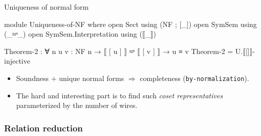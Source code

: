 \documentclass[aspectratio=169]{beamer}
\begin{document}
\begin{frame}{Uniqueness of normal form}
\begin{code}[hide]
module Uniqueness-of-NF where
  open Sect using (NF ; [_])
  open SymSem using (_≈ˢ_)
  open SymSem.Interpretation using (⟦_⟧)
\end{code}
\begin{code}
  Theorem-2 : ∀ n {u v : NF n} → ⟦ [ u ] ⟧ ≈ˢ ⟦ [ v ] ⟧ → u ≡ v
  Theorem-2 = U.⟦[]⟧-injective
\end{code}
  \vfill
  \begin{center}
  \end{center}
  
  \begin{itemize}
  \item Soundness $+$ unique normal forms $\Rightarrow$ completeness
  (\texttt{by-normalization}).
  \item The hard and interesting part is to find such \emph{coset
  representatives} parameterized by the number of wires.
  \end{itemize}
\end{frame}

\subsubsection{Relation reduction}
\end{document}
